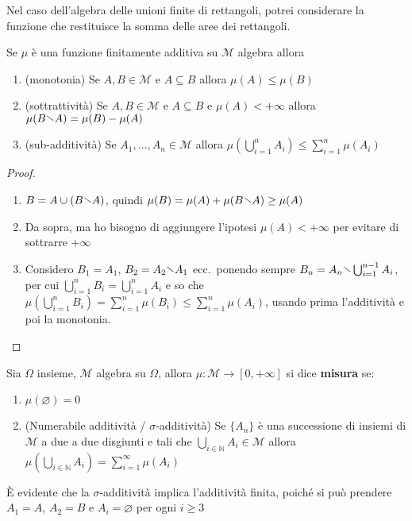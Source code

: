 \begin{example}
    Nel caso dell'algebra delle unioni finite di rettangoli, potrei considerare
    la funzione che restituisce la somma delle aree dei rettangoli.
\end{example}

\begin{proposition}
    Se \(\mu\) è una funzione finitamente additiva su \(\mathcal{M}\) algebra
    allora
\begin{enumerate}[label = \arabic*.]
    \item (monotonia) Se \(A, B \in \mathcal{M}\) e \(A \subseteq B \) allora \(\mu(A) \le
        \mu(B)\) 
    \item (sottrattività) Se \(A, B \in \mathcal{M}\) e \(A \subseteq B \) e \(\mu(A) <
        +\infty\) allora \(\mu(B \sminus A) = \mu(B) - \mu(A)\) 
    \item (sub-additività) Se \(A_{1}, \dots, A_{n} \in \mathcal{M} \) allora \(\mu\left(\bigcup_{i =
        1}^n A_{i}\right) \le \sum_{i=1}^{n} \mu(A_{i})\) 
\end{enumerate}
\end{proposition}
\begin{proof} \(\) 
\begin{enumerate}[label = \arabic*.]
    \item \(B = A \cup (B \sminus A)\), quindi \(\mu(B) = \mu(A) + \mu(B
        \sminus A) \ge \mu(A)\) 
    \item Da sopra, ma ho bisogno di aggiungere l'ipotesi \(\mu(A) < +\infty\)
        per evitare di sottrarre \(+\infty\) 
    \item Considero \(B_{1} = A_{1}\), \(B_{2} = A_{2} \sminus A_{1}\)
        ecc.\ ponendo sempre \(B_{n} = A_{n} \sminus \bigcup_{i=1}^{n-1}
        A_{i}\), per cui \(\bigcup_{i=1}^{n} B_{i} = \bigcup_{i=1}^{n} A_{i}  \)
        e so che \(\mu(\bigcup_{i=1}^{n} B_{i}) = \sum_{i=1}^{n} \mu(B_{i}) \le
        \sum_{i=1}^{n} \mu(A_{i})\), usando prima l'additività e poi la monotonia.
\end{enumerate}
\end{proof}

\begin{definition}[Misura]
    Sia \(\Omega\) insieme, \(\mathcal{M}\) algebra su \(\Omega\), allora \(\mu
    : \mathcal{M} \to [0, +\infty]\) si dice \textbf{misura} se:
\begin{enumerate}[label = \arabic*.]
    \item \(\mu(\varnothing) = 0\) 
    \item (Numerabile additività / \(\sigma\)-additività) Se \(\{A_{n}\} \) è una successione di insiemi di \(\mathcal{M}\) a
        due a due disgiunti e tali che  \(\bigcup_{i \in \mathbb{N}} A_{i} \in
        \mathcal{M}\) allora \(\mu\left( \bigcup_{i \in \mathbb{N}} A_{i}
        \right) = \sum_{i=1}^{\infty} \mu(A_{i})  \) 
\end{enumerate}
\end{definition}
\begin{remark}
    È evidente che la \(\sigma\)-additività implica l'additività finita, poiché
    si può prendere \(A_{1} = A\), \(A_{2} = B\) e \(A_{i} = \varnothing\) per
    ogni \(i \ge 3\) 
\end{remark}

